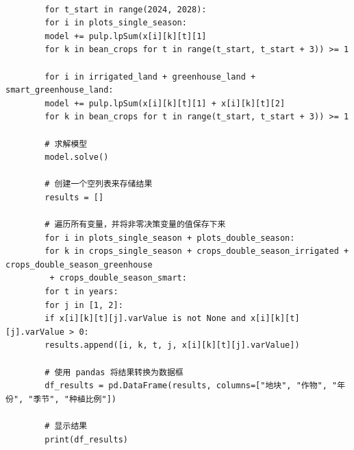\documentclass[12pt]{ctexart}
\begin{document}
\begin{verbatim}
		
		for t_start in range(2024, 2028):
		for i in plots_single_season:
		model += pulp.lpSum(x[i][k][t][1] 
		for k in bean_crops for t in range(t_start, t_start + 3)) >= 1
		
		for i in irrigated_land + greenhouse_land + smart_greenhouse_land:
		model += pulp.lpSum(x[i][k][t][1] + x[i][k][t][2] 
		for k in bean_crops for t in range(t_start, t_start + 3)) >= 1
		
		# 求解模型
		model.solve()
		
		# 创建一个空列表来存储结果
		results = []
		
		# 遍历所有变量，并将非零决策变量的值保存下来
		for i in plots_single_season + plots_double_season:
		for k in crops_single_season + crops_double_season_irrigated + crops_double_season_greenhouse
		 + crops_double_season_smart:
		for t in years:
		for j in [1, 2]:
		if x[i][k][t][j].varValue is not None and x[i][k][t][j].varValue > 0:
		results.append([i, k, t, j, x[i][k][t][j].varValue])
		
		# 使用 pandas 将结果转换为数据框
		df_results = pd.DataFrame(results, columns=["地块", "作物", "年份", "季节", "种植比例"])
		
		# 显示结果
		print(df_results)
	\end{verbatim}
	\noindent
\end{document}

